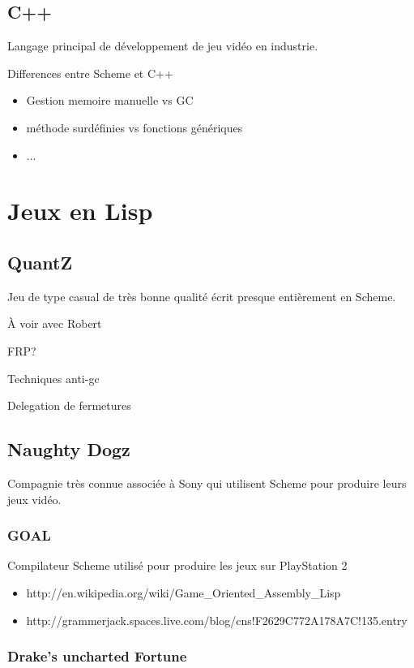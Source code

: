 \documentclass[12pt,oneside,letterpaper,francais]{book}
\begin{document}
\subsection{C++}
Langage principal de développement de jeu vidéo en industrie.

Differences entre Scheme et C++
\begin{itemize}
\item Gestion memoire manuelle vs GC
\item méthode surdéfinies vs fonctions génériques
\item ...
\end{itemize}


\section{Jeux en Lisp}

\subsection{QuantZ}
Jeu de type \og casual \fg de très bonne qualité écrit presque
entièrement en Scheme.

À voir avec Robert

FRP?

Techniques anti-gc

Delegation de fermetures

\subsection{Naughty Dogz}
Compagnie très connue associée à Sony qui utilisent Scheme pour
produire leurs jeux vidéo.

\subsubsection{GOAL}
Compilateur Scheme utilisé pour produire les jeux sur PlayStation 2

\begin{itemize}
\item http://en.wikipedia.org/wiki/Game\_Oriented\_Assembly\_Lisp
\item http://grammerjack.spaces.live.com/blog/cns!F2629C772A178A7C!135.entry
\end{itemize}

\subsubsection{Drake's uncharted Fortune}
\end{document}
